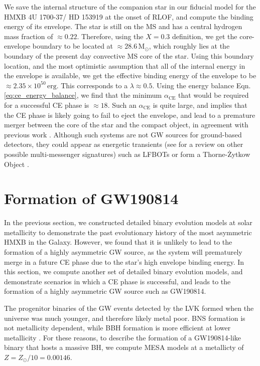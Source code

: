 \documentclass[linenumbers,trackchanges,twocolumn]{aastex701}
\newcommand{\Mdot}{\mathrm{M}_{\odot}}
\begin{document}
We save the internal structure of the
companion star in our fiducial model for the HMXB 4U 1700-37/ HD 153919 at the onset of RLOF, and compute the binding energy of
its envelope. The star is still on the MS and has a central hydrogen mass fraction of $\approx 0.22$.
Therefore, using the $X=0.3$ definition, we
get the core-envelope boundary to be located at $\approx
28.6\,\Mdot$, which roughly lies at the boundary of the present day  convective MS
core of the star. Using this boundary location, and the most
optimistic assumption that all of the internal energy in the envelope
is available, we get the effective binding energy of the envelope to
be $\approx 2.35\times 10^{50}\,\mathrm{erg}$. This corresponds to a
$\lambda \approx 0.5$. Using the energy balance Eqn.
\ref{eq:ce_energy_balance}, we find that the minimum
$\alpha_{\mathrm{CE}}$ that would be required for a successful CE phase is
$\approx 18$. Such an $\alpha_{\mathrm{CE}}$ is quite large, and implies that the CE
phase is likely going to fail to eject the envelope, and lead to a
premature merger between the core of the star and the compact object, in agreement with previous work \citep[e.g.,][]{1994MmSAI..65..359P, 2017MNRAS.471.4256V, 2017ApJ...846..170T, 2020A&A...634A..49H}. Although
such systems are not GW sources for ground-based detectors, they could appear as energetic transients (see \cite{2025Ap&SS.370...11G} for a review on other possible multi-messenger signatures) such as LFBOTs \citep{2025arXiv251009745K} or form a Thorne-\.Zytkow Object \citep[e.g.,][]{thorne:75, 2025A&A...694A..83N,TZO_review}.

\section{Formation of GW190814} \label{sec:gw190814}

In the previous section, we constructed detailed binary evolution
models at solar metallicity to demonstrate the past evolutionary history of the most asymmetric HMXB in the Galaxy. However, we found that it is unlikely to lead to the formation of a highly asymmetric GW source, as the system will prematurely merge in a future CE phase due to the star's high envelope binding energy. In this section, we compute another set of detailed binary evolution models, and demonstrate scenarios in which a CE phase is successful, and leads to the formation of a highly asymmetric GW source such as GW190814.

The progenitor binaries of the GW events detected by the LVK formed when the universe was much younger, and therefore likely metal poor. BNS formation is not metallicity dependent, while BBH formation is more efficient at lower metallicity \cite{2025ApJ...979..209V}.
For these reasons, to describe the formation of a GW190814-like binary that hosts a massive BH,
we compute \textsc{MESA} models at a metallicty of $Z = Z_\odot/10 = 0.00146$.
\end{document}
